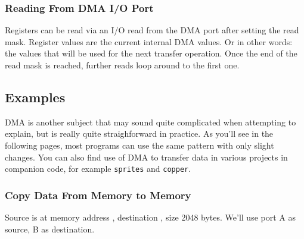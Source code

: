 {\begin{DMADescription}


	
\end{DMADescription}


\subsubsection{Reading From DMA I/O Port}

Registers can be read via an I/O read from the DMA port  after setting the read mask. Register values are the current internal DMA values. Or in other words: the values that will be used for the next transfer operation. Once the end of the read mask is reached, further reads loop around to the first one.


\subsection{Examples}

DMA is another subject that may sound quite complicated when attempting to explain, but is really quite straighforward in practice. As you'll see in the following pages, most programs can use the same pattern with only slight changes. You can also find use of DMA to transfer data in various projects in companion code, for example {\tt sprites} and {\tt copper}.


\pagebreak
\subsubsection{Copy Data From Memory to Memory}

Source is at memory address , destination , size 2048 bytes. We'll use port A as source, B as destination.

}
